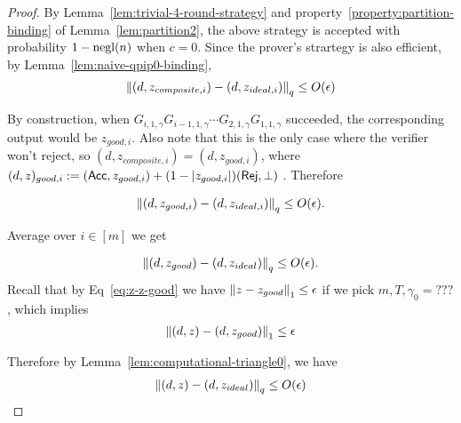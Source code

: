 \begin{proof}
By Lemma~\ref{lem:trivial-4-round-strategy} and property~\ref{property:partition-binding} of Lemma~\ref{lem:partition2}, the above strategy is accepted with probability $1-\operatorname{negl}(n)$ when $c=0$. Since the prover's strartegy is also efficient, by Lemma~\ref{lem:naive-qpip0-binding}, 
\begin{align}
    \left\lVert(d,z_{composite,i})-(d,z_{ideal,i})\right\rVert_q \leq O(\epsilon)
\end{align}



By construction, when $G_{i,1,\gamma}G_{i-1,1,\gamma} \cdots G_{2,1,\gamma}G_{1,1,\gamma}$ succeeded, the corresponding output would be $z_{good,i}$. Also note that this is the only case where the verifier won't reject, so $(d,z_{composite,i})=(d,z_{good,i})$, where  $(d,z)_{good,i} := (\mathsf{Acc}, z_{good,i}) + (1-|z_{good,i}|)(\mathsf{Rej},\bot)$  . Therefore

\begin{align}
    \left\lVert(d,z_{good,i})-(d,z_{ideal,i})\right\rVert_q \leq O(\epsilon).
\end{align}

Average over $i\in[m]$ we get

\begin{align}
    \left\lVert(d,z_{good})-(d,z_{ideal})\right\rVert_q \leq O(\epsilon).
\end{align}
Recall that by Eq~\ref{eq:z-z-good} we have $\left\lVert z-z_{good}\right\rVert_1 \leq \epsilon$ if we pick $m,T,\gamma_0=???$ , which implies 
\begin{align} 
    \left\lVert(d,z)-(d,z_{good})\right\rVert_1 \leq \epsilon
\end{align}

Therefore by Lemma~\ref{lem:computational-triangle0}, we have  
\begin{align}
     \left\lVert(d,z)-(d,z_{ideal})\right\rVert_q \leq O(\epsilon)
\end{align}

 
\end{proof}





